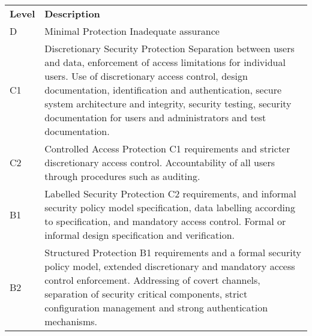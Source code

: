     \begin{table}[H]
        \begin{center}
        \begin{tabular}{|>{\sffamily}p{1cm}|>{\sffamily}p{12cm}|} \hline
            \multicolumn{2}{|c|}{\bfseries{\sffamily{TCSEC}}} \\ \hline
            \bfseries{Level} & \bfseries{Description} \\ \hline
            D  & Minimal Protection \newline
                 Inadequate assurance
                 \\ \hline
            C1 & Discretionary Security Protection \newline
                 Separation between users and data,
                 enforcement of access limitations for individual users.
                 Use of discretionary access control, design
                 documentation, identification and authentication,
                 secure system architecture and integrity,
                 security testing, security documentation for
                 users and administrators and test documentation.
                 \\ \hline
            C2 & Controlled Access Protection \newline
                    C1 requirements and stricter discretionary
                    access control. Accountability of all users
                    through procedures such as auditing.
                    \\ \hline
            B1 & Labelled Security Protection \newline
                    C2 requirements, and informal security policy
                    model specification, data labelling according
                    to specification, and mandatory access control.
                    Formal or informal design specification and
                    verification.
                    \\ \hline
            B2 & Structured Protection \newline
                    B1 requirements and a formal security policy model,
                    extended discretionary and mandatory access control
                    enforcement. Addressing of covert channels, 
                    separation of security critical components,
                    strict configuration management and strong
                    authentication mechanisms.
                    \\ \hline

\end{tabular}
\end{center}
\end{table}
